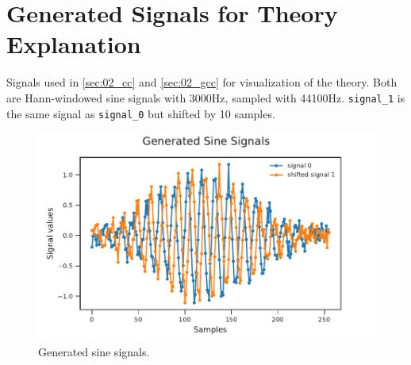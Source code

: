 \section{Generated Signals for Theory Explanation}
\label{appendix:a1_signals}


Signals used in \cref{sec:02_cc} and \cref{sec:02_gcc} for visualization of the theory.
Both are Hann-windowed sine signals with 3000\si{Hz}, sampled with 44100\si{Hz}.
\lstinline!signal_1! is the same signal as \lstinline!signal_0! but shifted by
10 samples.
\begin{figure}[ht]
	\centering
		\includegraphics[width=1\columnwidth]{figures/signals_theory}
	\caption{Generated sine signals.}
	\label{fig:ap1_signals}
\end{figure}


